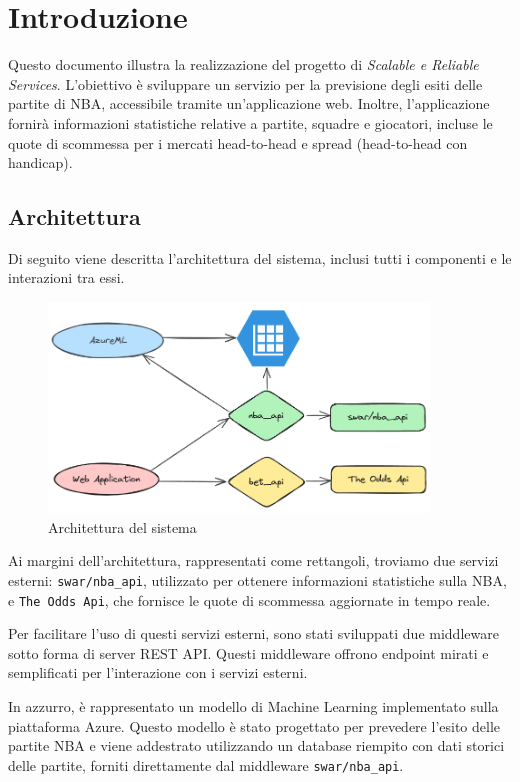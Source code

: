 \section{Introduzione}

Questo documento illustra la realizzazione del progetto di \textit{Scalable e Reliable Services}. L'obiettivo è sviluppare un servizio per la previsione degli esiti delle partite di NBA, accessibile tramite un'applicazione web. Inoltre, l'applicazione fornirà informazioni statistiche relative a partite, squadre e giocatori, incluse le quote di scommessa per i mercati head-to-head e spread (head-to-head con handicap).

\subsection{Architettura}

Di seguito viene descritta l'architettura del sistema, inclusi tutti i componenti e le interazioni tra essi.

\begin{figure}[H]
\centering
\includegraphics[width=0.9\textwidth]{img/architecture.png}
\caption{Architettura del sistema}
\end{figure}

Ai margini dell'architettura, rappresentati come rettangoli, troviamo due servizi esterni: \texttt{swar/nba\_api}, utilizzato per ottenere informazioni statistiche sulla NBA, e \texttt{The Odds Api}, che fornisce le quote di scommessa aggiornate in tempo reale.

Per facilitare l'uso di questi servizi esterni, sono stati sviluppati due middleware sotto forma di server REST API. Questi middleware offrono endpoint mirati e semplificati per l'interazione con i servizi esterni.

In azzurro, è rappresentato un modello di Machine Learning implementato sulla piattaforma Azure. Questo modello è stato progettato per prevedere l'esito delle partite NBA e viene addestrato utilizzando un database riempito con dati storici delle partite, forniti direttamente dal middleware \texttt{swar/nba\_api}.

